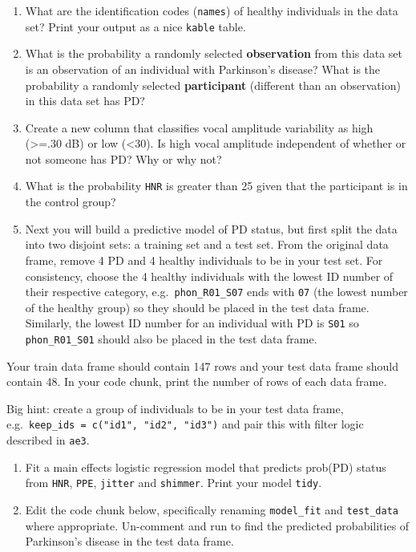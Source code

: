 \documentclass[
]{article}
\begin{document}
\begin{enumerate}
\def\labelenumi{\arabic{enumi}.}
\item
  What are the identification codes (\texttt{names}) of healthy
  individuals in the data set? Print your output as a nice
  \texttt{kable} table.
\item
  What is the probability a randomly selected \textbf{observation} from
  this data set is an observation of an individual with Parkinson's
  disease? What is the probability a randomly selected
  \textbf{participant} (different than an observation) in this data set
  has PD?
\item
  Create a new column that classifies vocal amplitude variability as
  high (\textgreater=.30 dB) or low (\textless30). Is high vocal
  amplitude independent of whether or not someone has PD? Why or why
  not?
\item
  What is the probability \texttt{HNR} is greater than 25 given that the
  participant is in the control group?
\item
  Next you will build a predictive model of PD status, but first split
  the data into two disjoint sets: a training set and a test set. From
  the original data frame, remove 4 PD and 4 healthy individuals to be
  in your test set. For consistency, choose the 4 healthy individuals
  with the lowest ID number of their respective category,
  e.g.~\texttt{phon\_R01\_S07} ends with \texttt{07} (the lowest number
  of the healthy group) so they should be placed in the test data frame.
  Similarly, the lowest ID number for an individual with PD is
  \texttt{S01} so \texttt{phon\_R01\_S01} should also be placed in the
  test data frame.
\end{enumerate}

Your train data frame should contain 147 rows and your test data frame
should contain 48. In your code chunk, print the number of rows of each
data frame.

Big hint: create a group of individuals to be in your test data frame,
e.g.~\texttt{keep\_ids\ =\ c("id1",\ "id2",\ "id3")} and pair this with
filter logic described in \texttt{ae3}.

\begin{enumerate}
\def\labelenumi{\arabic{enumi}.}
\setcounter{enumi}{5}
\item
  Fit a main effects logistic regression model that predicts prob(PD)
  status from \texttt{HNR}, \texttt{PPE}, \texttt{jitter} and
  \texttt{shimmer}. Print your model \texttt{tidy}.
\item
  Edit the code chunk below, specifically renaming \texttt{model\_fit}
  and \texttt{test\_data} where appropriate. Un-comment and run to find
  the predicted probabilities of Parkinson's disease in the test data
  frame.
\end{enumerate}
\end{document}
